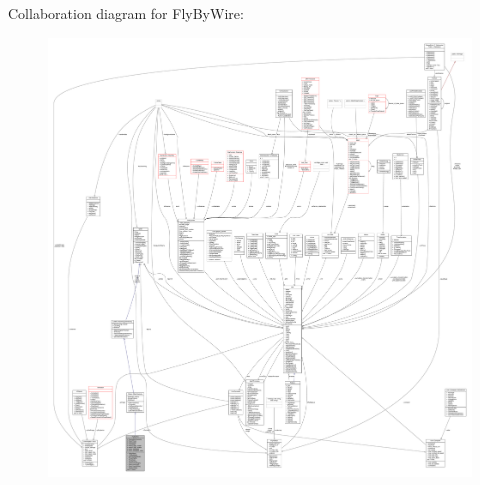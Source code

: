 Collaboration diagram for Fly\+By\+Wire\+:
\nopagebreak
\begin{figure}[H]
\begin{center}
\leavevmode
\includegraphics[width=350pt]{da/d12/classFlyByWire__coll__graph}
\end{center}
\end{figure}
